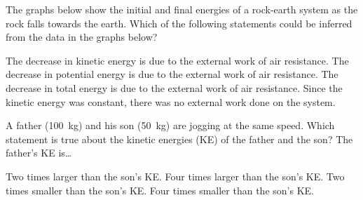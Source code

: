 \documentclass[answers,dvipsnames]{exam}
\begin{document}
\begin{questions}
\question
The graphs below show the initial and final energies of a rock-earth system as the rock falls towards the earth. Which of the following statements could be inferred from the data in the graphs below?

\begin{center}
    \hspace{1cm}
\end{center}

\begin{randomizechoices}[norandomize]
    \choice The decrease in kinetic energy is due to the external work of air resistance.
    \choice The decrease in potential energy is due to the external work of air resistance.
    \correctchoice The decrease in total energy is due to the external work of air resistance.
    \choice Since the kinetic energy was constant, there was no external work done on the system.
\end{randomizechoices}


\question
A father (\SI{100}{kg}) and his son (\SI{50}{kg}) are jogging at the same speed. Which statement is true about the kinetic energies (KE) of the father and the son? The father's KE is\dots

\begin{randomizechoices}[norandomize]
    \correctchoice Two times larger than the son's KE.
    \choice Four times larger than the son's KE.   
    \choice Two times smaller than the son's KE.
    \choice Four times smaller than the son's KE.
\end{randomizechoices}


\end{questions}
\end{document}
